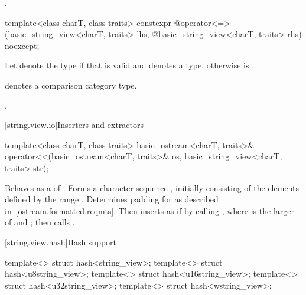 \begin{itemdescr}
\pnum
\returns
{}.
\end{itemdescr}

%
\begin{itemdecl}
template<class charT, class traits>
  constexpr @\seebelow@ operator<=>(basic_string_view<charT, traits> lhs,
            @\itcorr@                      basic_string_view<charT, traits> rhs) noexcept;
\end{itemdecl}

\begin{itemdescr}
\pnum
Let  denote the type  if
that  is valid and denotes a type,
otherwise  is .

\pnum
\mandates
{} denotes a comparison category type.

\pnum
\returns
{}.
\end{itemdescr}

[string.view.io]{Inserters and extractors}

%
\begin{itemdecl}
template<class charT, class traits>
  basic_ostream<charT, traits>&
    operator<<(basic_ostream<charT, traits>& os, basic_string_view<charT, traits> str);
\end{itemdecl}

\begin{itemdescr}
\pnum
\effects
Behaves as a  of . Forms a character sequence
, initially consisting of the elements defined by the range
. Determines padding for 
as described in~\ref{ostream.formatted.reqmts}.
Then inserts  as if by calling
, where  is the larger
of  and ;
then calls .

\pnum
\returns
{}
\end{itemdescr}

[string.view.hash]{Hash support}

%
%
%
%
%
\begin{itemdecl}
template<> struct hash<string_view>;
template<> struct hash<u8string_view>;
template<> struct hash<u16string_view>;
template<> struct hash<u32string_view>;
template<> struct hash<wstring_view>;
\end{itemdecl}

